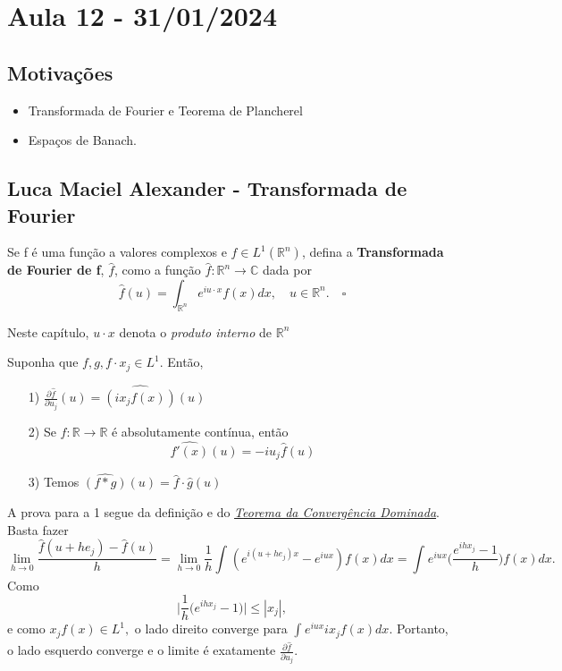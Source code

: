 \documentclass[MeasureTheory/measure_theory.tex]{subfiles}
\begin{document}
\section{Aula 12 - 31/01/2024}
\subsection{Motivações}
\begin{itemize}
	\item Transformada de Fourier e Teorema de Plancherel
	\item Espaços de Banach.
\end{itemize}
\subsection{Luca Maciel Alexander - Transformada de Fourier}
\begin{def*}
	Se f é uma função a valores complexos e \(f\in L^{1}(\mathbb{R}^{n})\), defina a \textbf{Transformada de Fourier de f}, \(\hat{f}\), como a função \(\hat{f}:\mathbb{R}^{n}\rightarrow \mathbb{C}\) dada por
	\[
		\hat{f}(u) = \int_{\mathbb{R}^{n}}^{}e^{iu \cdot x}f(x)dx,\quad u\in \mathbb{R}^{n}.\quad \square
	\]
\end{def*}
Neste capítulo, \(u \cdot x\) denota o \textit{produto interno} de \(\mathbb{R}^{n}\)
\begin{prop*}
	Suponha que \(f, g, f \cdot x_{j}\in L^{1}.\) Então,
	\begin{itemize}
		\item[1)] \(\frac{\partial \hat{f}}{\partial u_{j}}(u) = \widehat{(ix_{j}f(x))}(u)\)
		\item[2)] Se \(f:\mathbb{R}\rightarrow \mathbb{R}\) é absolutamente contínua, então
		      \[
			      \hat{f'(x)}(u) = -iu_{j}\hat{f}(u)
		      \]
		\item[3)] Temos \(\widehat{(f*g)}(u) = \hat{f}\cdot \hat{g}(u)\)
	\end{itemize}
\end{prop*}
\begin{proof*}
	A prova para a 1 segue da definição e do \hyperlink{dominated_convergence}{\textit{Teorema da Convergência Dominada}}. Basta fazer
	\[
		\lim_{h\to 0}\frac{\hat{f}(u+he_{j}) - \hat{f}(u)}{h} = \lim_{h\to 0} \frac{1}{h}\int_{}^{}(e^{i(u+he_{j})x}-e^{iux})f(x)dx = \int_{}^{}e^{iux}\biggl(\frac{e^{ihx_{j}} -1}{h}\biggr)f(x)dx.
	\]
	Como
	\[
		\biggl\vert \frac{1}{h}\biggl(e^{ihx_{j}}-1\biggr) \biggr\vert\leq |x_{j}|,
	\]
	e como \(x_{j}f(x)\in L^{1},\) o lado direito converge para \(\int_{}^{}e^{iux}ix_{j}f(x)dx\). Portanto, o lado esquerdo converge e o limite é exatamente \(\frac{\partial \hat{f}}{\partial u_{j}}\).
\end{proof*}
\end{document}

